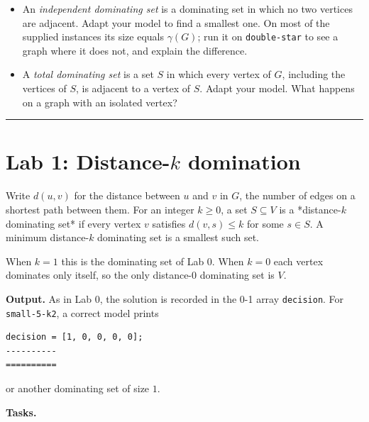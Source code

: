 \documentclass[11pt]{article}
\begin{document}
\begin{itemize}
\item An \emph{independent dominating set} is a dominating set in which no two vertices are adjacent. Adapt your model to find a smallest one. On most of the supplied instances its size equals $\gamma(G)$; run it on \mbox{\texttt{double-{}star}} to see a graph where it does not, and explain the difference.
\item A \emph{total dominating set} is a set $S$ in which every vertex of $G$, including the vertices of $S$, is adjacent to a vertex of $S$. Adapt your model. What happens on a graph with an isolated vertex?
\end{itemize}
\bigskip\hrule\bigskip

\section*{Lab 1: Distance-$k$ domination}

Write $d(u, v)$ for the distance between $u$ and $v$ in $G$, the number of edges on a shortest path between them. For an integer $k \ge 0$, a set $S \subseteq V$ is a *distance-$k$ dominating set* if every vertex $v$ satisfies $d(v, s) \le k$ for some $s \in S$. A minimum distance-$k$ dominating set is a smallest such set.

When $k = 1$ this is the dominating set of Lab 0. When $k = 0$ each vertex dominates only itself, so the only distance-$0$ dominating set is $V$.

\textbf{Output.} As in Lab 0, the solution is recorded in the 0-1 array \mbox{\texttt{decision}}. For \mbox{\texttt{small-{}5-{}k2}}, a correct model prints

\begin{Verbatim}
decision = [1, 0, 0, 0, 0];
----------
==========
\end{Verbatim}
or another dominating set of size $1$.

\textbf{Tasks.}
\end{document}
